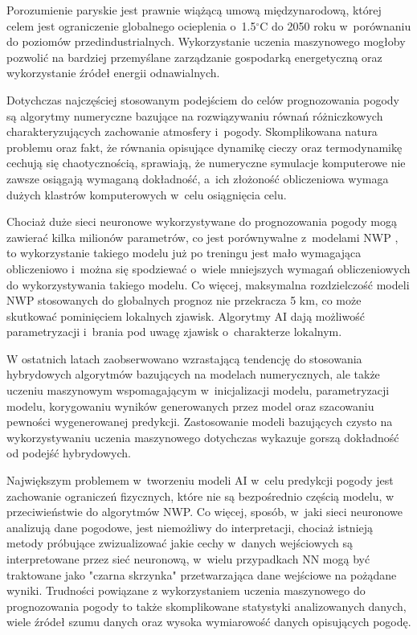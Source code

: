 Porozumienie paryskie jest prawnie wiążącą umową międzynarodową,
której celem jest ograniczenie globalnego ocieplenia o~1.5$^{\circ}$C
do 2050 roku w~porównaniu do poziomów przedindustrialnych. Wykorzystanie
uczenia maszynowego mogłoby pozwolić na bardziej przemyślane zarządzanie
gospodarką energetyczną oraz wykorzystanie źródeł energii odnawialnych.

Dotychczas najczęściej stosowanym podejściem do celów prognozowania
pogody są algorytmy numeryczne bazujące na rozwiązywaniu równań różniczkowych
charakteryzujących zachowanie atmosfery i~pogody. Skomplikowana natura
problemu oraz fakt, że równania opisujące dynamikę cieczy oraz termodynamikę
cechują się chaotycznością, sprawiają, że numeryczne symulacje komputerowe
nie zawsze osiągają wymaganą dokładność, a~ich złożoność obliczeniowa
wymaga dużych klastrów komputerowych w~celu osiągnięcia celu.

Chociaż duże sieci neuronowe wykorzystywane do prognozowania pogody
mogą zawierać kilka milionów parametrów, co jest porównywalne z~modelami
NWP \cite{can-dl-beat-numerical}, to wykorzystanie takiego modelu już po treningu
jest mało wymagająca obliczeniowo i~można się spodziewać o~wiele mniejszych wymagań
obliczeniowych do wykorzystywania takiego modelu. Co więcej, maksymalna rozdzielczość
modeli NWP stosowanych do globalnych prognoz nie przekracza 5 km, 
co może skutkować pominięciem lokalnych zjawisk. Algorytmy AI dają możliwość
parametryzacji i~brania pod uwagę zjawisk o~charakterze lokalnym.

W ostatnich latach zaobserwowano wzrastającą tendencję do stosowania hybrydowych
algorytmów bazujących na modelach numerycznych, ale także uczeniu maszynowym
wspomagającym w~inicjalizacji modelu, parametryzacji modelu, korygowaniu
wyników generowanych przez model oraz szacowaniu pewności wygenerowanej
predykcji. Zastosowanie modeli bazujących czysto na wykorzystywaniu uczenia
maszynowego dotychczas wykazuje gorszą dokładność od podejść hybrydowych.

Największym problemem w~tworzeniu modeli AI w~celu predykcji pogody jest
zachowanie ograniczeń fizycznych, które nie są bezpośrednio częścią modelu,
w przeciwieństwie do algorytmów NWP. Co więcej, sposób, w~jaki sieci neuronowe
analizują dane pogodowe, jest niemożliwy do interpretacji, chociaż istnieją
metody próbujące zwizualizować jakie cechy w~danych wejściowych są interpretowane
przez sieć neuronową, w~wielu przypadkach NN mogą być traktowane jako "czarna 
skrzynka" przetwarzająca dane wejściowe na pożądane wyniki. Trudności powiązane
z wykorzystaniem uczenia maszynowego do prognozowania pogody to także skomplikowane
statystyki analizowanych danych, wiele źródeł szumu danych oraz wysoka wymiarowość
danych opisujących pogodę.

